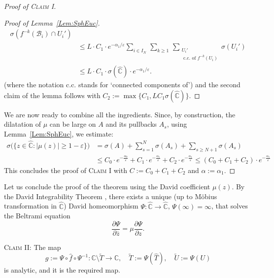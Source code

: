 \documentclass[11pt,a4paper, oneside]{amsart}
\theoremstyle{definition}
\theoremstyle{remark}
\numberwithin{equation}{section}
\renewcommand{\ge}{\geqslant}
\renewcommand{\le}{\leqslant}
\renewcommand{\hat}{\widehat}
\newcommand{\eps}{\varepsilon}
\newcommand{\ovl}{\overline}
\newcommand{\C}{\mathbb{C}}
\newcommand{\Cc}{\widehat{{\C}}}
\newcommand{\sm}{\setminus}
\renewcommand{\tilde}{\widetilde}
\begin{document}
\begin{proof}[Proof of \textsc{Claim I}]
\begin{proof}[Proof of Lemma~\ref{Lem:SphEuc}]
\begin{equation*}
{\begin{aligned}
			\sigma\left(f^{-k}(\mathcal{B}_i) \cap U_i'\right)\\
			&\le L\cdot C_1\cdot e^{-\alpha_1/\eps}
			\sum_{i\in I_N} \, \sum_{k \ge 1} \,
			\sum_{\substack{U_i'\\ \text{ c.c. of }f^{-k}(U_i)}} \sigma(U_i')\\
			&\le L\cdot C_1\cdot \sigma(\Cc)\cdot e^{-\alpha_1/\eps}.
	\end{aligned}}
\end{equation*}
(where the notation c.c. stands for ‘connected components of’) and the second claim of the lemma follows with {$C_2:=\max\{C_1,LC_1\sigma(\Cc)\}$.}
\end{proof}
We are now ready to combine all the ingredients. Since, by construction, the dilatation of $\mu$ can be large on {$A$ and its pullbacks $A_s$,} using Lemma~\ref{Lem:SphEuc}, we estimate:
\begin{equation}
    \begin{aligned}
\sigma\big(\{z \in \Cc : |\mu(z)|\ge 1-\eps\}\big) &= \sigma(A) + \sum_{s = 1}^{N} \sigma\left({A_s}\right) + \sum_{s \ge N+1} \sigma\left({A_s}\right) \\ 
        &\le C_0 \cdot e^{-\frac{\alpha_0}{\eps}} + C_1 \cdot e^{-\frac{\alpha_1}{\eps}} + C_2 \cdot e^{-\frac{\alpha_1}{\eps}} \le (C_0+C_1+C_2) \cdot e^{-\frac{\alpha_1}{\eps}}    
    \end{aligned}
\end{equation}
This concludes the proof of \textsc{Claim I} with $C := C_0+C_1+C_2$ and $\alpha := \alpha_1$.
\end{proof}

Let us conclude the proof of the theorem using the David coefficient $\mu(z)$. By the David Integrability Theorem \cite[Theorem 20.6.2]{David}, there exists a unique (up to M\"obius transformation in $\Cc$) David homeomorphism $\Psi \colon \Cc \to \Cc$, $\Psi(\infty) = \infty$, that solves the Beltrami equation
\[
\frac{\partial \Psi}{\partial \ovl z} = \mu \frac{\partial \Psi}{\partial z}.
\]



\noindent
\textsc{Claim II:} {The map 
\[
g:= \Psi \circ \hat f \circ \Psi^{-1} \colon \C \sm \tilde T \to \C, \quad \tilde T:=\Psi(\hat T), \quad \tilde U := \Psi(U)
\]
is analytic, and it is the required map.} 
\end{document}
